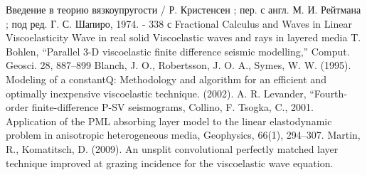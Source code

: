 \documentclass[a4paper, fontsize=14pt]{article}
\begin{document}
\newpage


\begin{thebibliography}{9}
     Введение в теорию вязкоупругости / Р. Кристенсен ; пер. с англ. М. И. Рейтмана ; под ред. Г. С. Шапиро, 1974. - 338 с
     Fractional Calculus and Waves in Linear Viscoelasticity
     Wave in real solid
     Viscoelastic waves and rays in layered media
     T. Bohlen, “Parallel 3-D viscoelastic finite difference seismic modelling,” Comput. Geosci. 28, 887–899
     Blanch, J. O., Robertsson, J. O. A.,  Symes, W. W. (1995). Modeling of a constantQ: Methodology and algorithm for an efficient and optimally inexpensive viscoelastic technique. 
    (2002).
     A. R. Levander, “Fourth-order finite-difference P-SV seismograms,
     Collino, F. Tsogka, C., 2001. Application of the PML absorbing layer
    model to the linear elastodynamic problem in anisotropic heterogeneous
    media, Geophysics, 66(1), 294–307.
     Martin, R.,  Komatitsch, D. (2009). An unsplit convolutional perfectly matched layer technique improved at grazing incidence for the viscoelastic wave equation.
\end{thebibliography}
\end{document}
